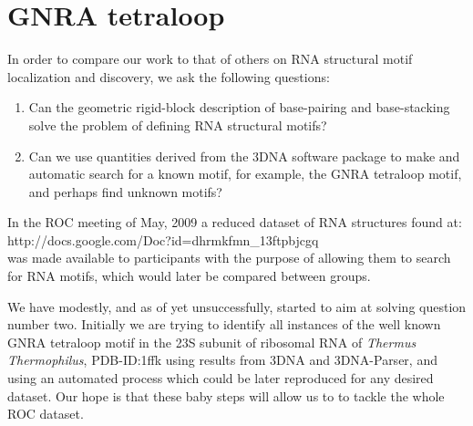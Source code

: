 \section{GNRA tetraloop}
In order to compare our work to that of others on RNA structural motif
localization and discovery, we ask the following questions:
\begin{enumerate}
\item{Can the geometric rigid-block description of base-pairing and
base-stacking solve the problem of defining RNA structural motifs?}
\item{Can we use quantities derived from the 3DNA software package to make
and automatic search for a known motif, for example, the GNRA
tetraloop motif, and perhaps find unknown motifs?}
\end{enumerate}
In the ROC meeting of May, 2009 a reduced dataset of RNA
structures found at:\\
http://docs.google.com/Doc?id=dhrmkfmn\_13ftpbjcgq\\
was made available to participants with the purpose of allowing
them to search for RNA motifs, which would later be compared between groups.

We have modestly, and as of yet unsuccessfully, started to aim at solving
question number two. Initially we are trying to identify all
instances of the well known GNRA tetraloop motif in
the 23S subunit of ribosomal RNA of \textit{Thermus Thermophilus},
PDB-ID:1ffk using results from 3DNA and 3DNA-Parser, and using an
automated process which could be later reproduced for any desired dataset.
Our hope is that these baby steps will allow us to to tackle the whole ROC dataset.

